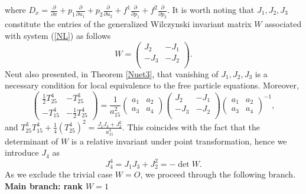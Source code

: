 \documentclass[12pt]{article}
\begin{document}
 where $D_x=\frac{\partial}{\partial x}+p_1\frac{\partial}{\partial u_1}+p_2\frac{\partial}{\partial u_2}+f^1\frac{\partial}{\partial p_1}+f^2\frac{\partial}{\partial p_2}$. It is worth noting that $J_1,J_2,J_3$ constitute the entries of the generalized Wilczynski invariant matrix $W$ associated with system (\ref{NL}) as follows
\begin{equation}\label{W}
W=\begin{pmatrix}
J_2&-J_1\\
-J_3&-J_2\\
\end{pmatrix}.
\end{equation}
 Neut also presented, in Theorem \ref{Nuet3}, that vanishing of $J_1,J_2,J_3$ is a necessary condition for local equivalence to the free particle equations. 
 Moreover, 
\begin{equation}
\begin{pmatrix}
\frac{1}{2}T^4_{25}&-T^3_{25}\\
-T^4_{15}&-\frac{1}{2}T^4_{25}
\end{pmatrix}=\frac{1}{a_{15}^2}
\begin{pmatrix}
a_1&a_2\\
a_3&a_4
\end{pmatrix}\begin{pmatrix}
J_2&-J_1\\
-J_3&-J_2\\
\end{pmatrix}\begin{pmatrix}
a_1&a_2\\
a_3&a_4
\end{pmatrix}^{-1},
\end{equation}
and $T^3_{25}T^4_{15}+\frac{1}{4}(T^4_{25})^2=\frac{J_1J_3+J_2^2}{a^4_{15}}$.
This coincides with the fact that the determinant of $W$ is a relative invariant under point transformation, hence we introduce $J_4$ as
\begin{equation}\label{139}
J_4^4=J_1J_3+J_2^2=-\det W.
\end{equation}
As we exclude the trivial case $W=O$, we proceed through the following branch.\\

\textbf{Main branch: rank $W=1$}\\
\end{document}
